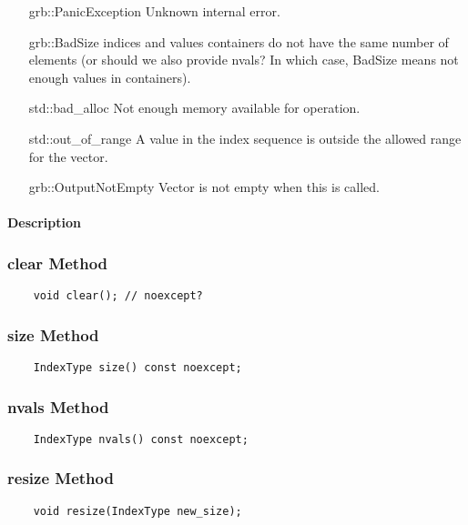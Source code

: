{\begin{itemize}[leftmargin=2.1in]
    \item[{\sf grb::PanicException}]   Unknown internal error.
    \item[{\sf grb::BadSize}]          indices and values containers do not have
                                       the same number of elements (or should we 
                                       also provide nvals? In which case, BadSize 
                                       means not enough values in containers).
    \item[{\sf std::bad\_alloc}]       Not enough memory available for operation.
    \item[{\sf std::out\_of\_range}]   A value in the index sequence is outside the
                                       allowed range for the vector.
    \item[{\sf grb::OutputNotEmpty}]   Vector is not empty when this is called.                                  
\end{itemize}

\paragraph{Description}

\subsubsection{{\sf clear} Method}
\begin{verbatim}
    void clear(); // noexcept?
\end{verbatim}

\subsubsection{{\sf size} Method}
\begin{verbatim}
    IndexType size() const noexcept;
\end{verbatim}

\subsubsection{{\sf nvals} Method}
\begin{verbatim}
    IndexType nvals() const noexcept;
\end{verbatim}

\subsubsection{{\sf resize} Method}
\begin{verbatim}
    void resize(IndexType new_size);
\end{verbatim}


}
